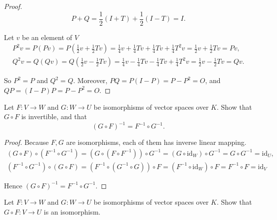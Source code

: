 \begin{proof}
    \[
        P + Q = \frac{1}{2}(I + T) + \frac{1}{2}(I - T) = I.
    \]

    Let $v$ be an element of $V$
    \[
        \begin{split}
            P^{2}v = P(Pv) = P(\frac{1}{2}v + \frac{1}{2}Tv) = \frac{1}{4}v + \frac{1}{4}Tv + \frac{1}{4}Tv + \frac{1}{4}T^{2}v = \frac{1}{2}v + \frac{1}{2}Tv = Pv, \\
            Q^{2}v = Q(Qv) = Q(\frac{1}{2}v - \frac{1}{2}Tv) = \frac{1}{4}v - \frac{1}{4}Tv - \frac{1}{4}Tv + \frac{1}{4}T^{2}v = \frac{1}{2}v - \frac{1}{2}Tv = Qv.
        \end{split}
    \]

    So $P^{2} = P$ and $Q^{2} = Q$. Moreover, $PQ = P(I - P) = P - P^{2} = O$, and $QP = (I - P)P = P - P^{2} = O$.
\end{proof}

\begin{exercise}
    Let $F: V \to W$ and $G: W \to U$ be isomorphisms of vector spaces over $K$. Show that $G\circ F$ is invertible, and that
    \[
        {(G \circ F)}^{-1} = F^{-1} \circ G^{-1}.
    \]
\end{exercise}

\begin{proof}
    Because $F, G$ are isomorphisms, each of them has inverse linear mapping.
    \[
        \begin{split}
            (G\circ F)\circ (F^{-1}\circ G^{-1}) = (G\circ (F\circ F^{-1}))\circ G^{-1} = (G\circ \text{id}_{W}) \circ G^{-1} = G\circ G^{-1} = \text{id}_{U}, \\
            (F^{-1}\circ G^{-1})\circ (G\circ F) = (F^{-1}\circ (G^{-1}\circ G))\circ F = (F^{-1}\circ \text{id}_{W})\circ F = F^{-1}\circ F = \text{id}_{V}
        \end{split}
    \]

    Hence ${(G\circ F)}^{-1} = F^{-1}\circ G^{-1}$.
\end{proof}

\begin{exercise}
    Let $F: V\to W$ and $G: W\to U$ be isomorphisms of vector spaces over $K$. Show that $G\circ F: V\to U$ is an isomorphism.
\end{exercise}

